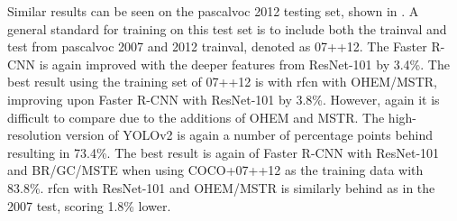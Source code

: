 Similar results can be seen on the \gls{pascalvoc} 2012 testing set, shown in . A general standard for training on this test set is to include both the trainval and test from \gls{pascalvoc} 2007 and 2012 trainval, denoted as 07++12. The Faster R-CNN is again improved with the deeper features from ResNet-101 by 3.4\%. The best result using the training set of 07++12 is with \gls{rfcn} with OHEM/MSTR, improving upon Faster R-CNN with ResNet-101 by 3.8\%. However, again it is difficult to compare due to the additions of OHEM and MSTR. The high-resolution version of YOLOv2 is again a number of percentage points behind resulting in 73.4\%. The best result is again of Faster R-CNN with ResNet-101 and BR/GC/MSTE when using COCO+07++12 as the training data with 83.8\%. \gls{rfcn} with ResNet-101 and OHEM/MSTR is similarly behind as in the 2007 test, scoring 1.8\% lower.


